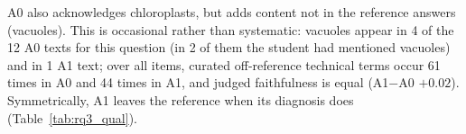 \begin{table}[h]
\centering\footnotesize

\caption{Mechanisms behind A1 vs.\ A0, from reading paired materials and counting their recurrence over the 180 pilot items (no student answers reproduced). Item IDs refer to the released outputs; ``diag.'': grade estimated by the diagnosis. Off-reference terms come from a curated list of school-biology terms absent from both the reference answers and the static text S of the question; ``not traceable'' means the term does not occur in the diagnosis either, which quotes the student's answer.}
\label{tab:rq3_qual}
\end{table}

A0 also acknowledges chloroplasts, but adds content not in the reference answers (vacuoles). This is occasional rather than systematic: vacuoles appear in 4 of the 12 A0 texts for this question (in 2 of them the student had mentioned vacuoles) and in 1 A1 text; over all items, curated off-reference technical terms occur 61 times in A0 and 44 times in A1, and judged faithfulness is equal (A1$-$A0 $+0.02$). Symmetrically, A1 leaves the reference when its diagnosis does (Table~\ref{tab:rq3_qual}).
